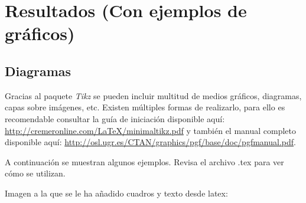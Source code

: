 \chapter{Resultados (Con ejemplos de gráficos)}
\label{resultados}

\section{Diagramas}
Gracias al paquete \textit{Tikz} se pueden incluir multitud de medios gráficos, diagramas, capas sobre imágenes, etc.
Existen múltiples formas de realizarlo, para ello es recomendable consultar la guía de iniciación disponible aquí: \url{http://cremeronline.com/LaTeX/minimaltikz.pdf} y también el manual completo disponible aquí: \url{http://osl.ugr.es/CTAN/graphics/pgf/base/doc/pgfmanual.pdf}.
\\
\par A continuación se muestran algunos ejemplos. Revisa el archivo .tex para ver cómo se utilizan.
\\
\par Imagen a la que se le ha añadido cuadros y texto desde latex:
